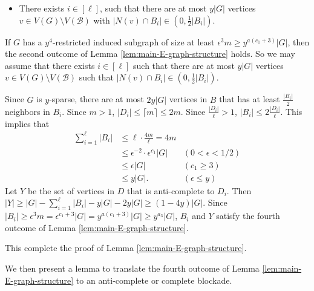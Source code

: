 \documentclass[a4paper,11pt]{article}
\let\oldendproof\endproof
\renewenvironment{proof}[1][\proofname]{%
	\oldproof[\normalfont\bfseries #1]%
}{\oldendproof}
\begin{document}
\begin{proof}
\begin{itemize}
            \item There exists $i\in[\ell]$, such that there are at most $y|G|$ vertices $v\in V(G)\setminus V(\mathcal{B})$ with $|N(v)\cap B_i|\in(0,\frac{1}{2}|B_i|)$.
            
        \end{itemize}
        If $G$ has a $y^{4}$-restricted induced subgraph of size at least $\epsilon^3m\geq y^{a(c_1+3)}|G|$, then the second outcome of Lemma \ref{lem:main-E-graph-structure} holds. 
        So we may assume that there exists $i\in[\ell]$ such that there are at most $y|G|$ vertices $v\in V(G)\setminus V(\mathcal{B})$ such that $|N(v)\cap B_i|\in(0,\frac{1}{2}|B_i|)$. 
        
        Since $G$ is $y$-sparse, there are at most $2y|G|$ vertices in $B$ that has at least $\frac{|B_i|}{2}$ neighbors in $B_i$.  
        Since $m>1$, $|D_i|\le \lceil m \rceil\le 2m$. 
        Since $\frac{|D_i|}{\ell}>1$, $|B_i|\le 2\frac{|D_i|}{\ell}$. This implies that 
        \begin{align*}
            \sum_{i=1}^{\ell}|B_i| & \le \ell\cdot \frac{4m}{\ell} =4m\\
            &  \leq \epsilon^{-2}\cdot \epsilon^{c_1}|G| & (0<\epsilon<1/2)\\
            &\le \epsilon |G| & (c_1\ge 3)\\
            & \le y|G|.          & (\epsilon \le y)  
        \end{align*}
        Let $Y$ be the set of vertices in $D$ that is anti-complete to $D_i$.
        Then $|Y|\geq |G|-\sum_{i=1}^{\ell}|B_i|-y|G|-2y|G|\geq (1-4y)|G|$.
        Since $|B_i|\geq \epsilon^{3}m= \epsilon^{c_1+3}|G|=y^{a(c_1+3)}|G|\geq y^{a_3}|G|$, $B_i$ and $Y$ satisfy the fourth outcome of Lemma \ref{lem:main-E-graph-structure}. 
        
        This complete the proof of Lemma \ref{lem:main-E-graph-structure}. 
    \end{proof}
   
    We then present a lemma to translate the fourth outcome of Lemma \ref{lem:main-E-graph-structure} to an anti-complete or complete blockade. 
\end{document}
